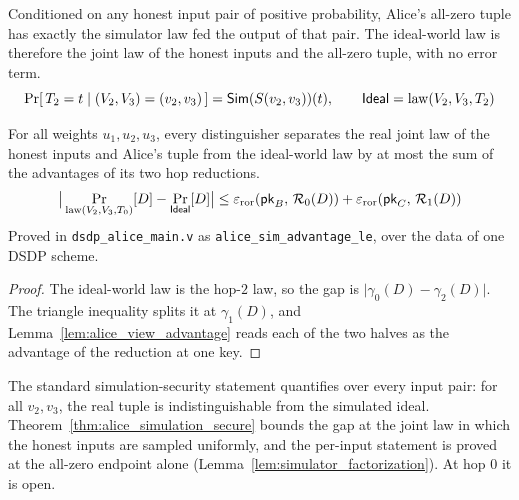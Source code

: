 \begin{lemma}
  \label{lem:simulator_factorization}
  \rocqok
  Conditioned on any honest input pair of positive probability, Alice's all-zero
  tuple has exactly the simulator law fed the output of that pair. The
  ideal-world law is therefore the joint law of the honest inputs and the
  all-zero tuple, with no error term.
  \[ \Pr[\,T_{2} = t \mid (V_2,V_3) = (v_2,v_3)\,] = \mathsf{Sim}(S(v_2,v_3))(t),
     \qquad \mathsf{Ideal} = \mathrm{law}(V_2, V_3, T_{2}) \]
\end{lemma}

\begin{theorem}
  \label{thm:alice_simulation_secure}
  \rocqok
  For all weights $u_1, u_2, u_3$, every distinguisher separates the real joint
  law of the honest inputs and Alice's tuple from the ideal-world law by at most
  the sum of the advantages of its two hop reductions.
  \[ \big\lvert \Pr_{\mathrm{law}(V_2,V_3,T_{0})}[D]
       - \Pr_{\mathsf{Ideal}}[D] \big\rvert \le \varepsilon_{\mathrm{ror}}(\mathsf{pk}_B,\,\mathcal{R}_{0}(D)) + \varepsilon_{\mathrm{ror}}(\mathsf{pk}_C,\,\mathcal{R}_{1}(D)) \]
  Proved in \texttt{dsdp\_alice\_main.v} as
  \texttt{alice\_sim\_advantage\_le}, over the data of one DSDP scheme.
\end{theorem}
\begin{proof}
  \rocqok
  The ideal-world law is the hop-$2$ law, so the gap is
  $\lvert \gamma_0(D) - \gamma_2(D) \rvert$. The triangle inequality splits it
  at $\gamma_1(D)$, and Lemma~\ref{lem:alice_view_advantage} reads each of the
  two halves as the advantage of the reduction at one key.
\end{proof}

\begin{remark}
  \label{rem:worstcase_sim}
  \rocqok
  The standard simulation-security statement quantifies over every input pair:
  for all $v_2, v_3$, the real tuple is indistinguishable from the simulated
  ideal. Theorem~\ref{thm:alice_simulation_secure} bounds the gap at the joint
  law in which the honest inputs are sampled uniformly, and the per-input
  statement is proved at the all-zero endpoint alone
  (Lemma~\ref{lem:simulator_factorization}). At hop $0$ it is open.
\end{remark}

